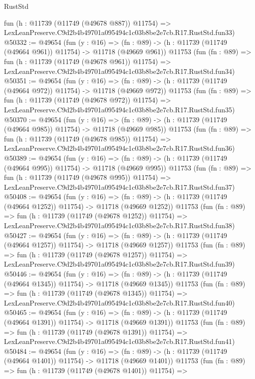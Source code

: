 \begin{lexlean}{RustStd}
\begin{coremodule}
    fun (h : @11739 (@11749 (@49678 @887)) @11754) =>
    LexLeanPreserve.C9d2b4b49701a095494c1c03b8be2e7cb.R17.RustStd.fun33)
@50332 := @49654
    (fun (y : @16) =>
    (fn : @89) -> (h : @11739 (@11749 (@49664 @961)) @11754) -> @11718 (@49669 @961))
    @11753
    (fun (fn : @89) =>
    fun (h : @11739 (@11749 (@49678 @961)) @11754) =>
    LexLeanPreserve.C9d2b4b49701a095494c1c03b8be2e7cb.R17.RustStd.fun34)
@50351 := @49654
    (fun (y : @16) =>
    (fn : @89) -> (h : @11739 (@11749 (@49664 @972)) @11754) -> @11718 (@49669 @972))
    @11753
    (fun (fn : @89) =>
    fun (h : @11739 (@11749 (@49678 @972)) @11754) =>
    LexLeanPreserve.C9d2b4b49701a095494c1c03b8be2e7cb.R17.RustStd.fun35)
@50370 := @49654
    (fun (y : @16) =>
    (fn : @89) -> (h : @11739 (@11749 (@49664 @985)) @11754) -> @11718 (@49669 @985))
    @11753
    (fun (fn : @89) =>
    fun (h : @11739 (@11749 (@49678 @985)) @11754) =>
    LexLeanPreserve.C9d2b4b49701a095494c1c03b8be2e7cb.R17.RustStd.fun36)
@50389 := @49654
    (fun (y : @16) =>
    (fn : @89) -> (h : @11739 (@11749 (@49664 @995)) @11754) -> @11718 (@49669 @995))
    @11753
    (fun (fn : @89) =>
    fun (h : @11739 (@11749 (@49678 @995)) @11754) =>
    LexLeanPreserve.C9d2b4b49701a095494c1c03b8be2e7cb.R17.RustStd.fun37)
@50408 := @49654
    (fun (y : @16) =>
    (fn : @89) -> (h : @11739 (@11749 (@49664 @1252)) @11754) -> @11718 (@49669 @1252))
    @11753
    (fun (fn : @89) =>
    fun (h : @11739 (@11749 (@49678 @1252)) @11754) =>
    LexLeanPreserve.C9d2b4b49701a095494c1c03b8be2e7cb.R17.RustStd.fun38)
@50427 := @49654
    (fun (y : @16) =>
    (fn : @89) -> (h : @11739 (@11749 (@49664 @1257)) @11754) -> @11718 (@49669 @1257))
    @11753
    (fun (fn : @89) =>
    fun (h : @11739 (@11749 (@49678 @1257)) @11754) =>
    LexLeanPreserve.C9d2b4b49701a095494c1c03b8be2e7cb.R17.RustStd.fun39)
@50446 := @49654
    (fun (y : @16) =>
    (fn : @89) -> (h : @11739 (@11749 (@49664 @1345)) @11754) -> @11718 (@49669 @1345))
    @11753
    (fun (fn : @89) =>
    fun (h : @11739 (@11749 (@49678 @1345)) @11754) =>
    LexLeanPreserve.C9d2b4b49701a095494c1c03b8be2e7cb.R17.RustStd.fun40)
@50465 := @49654
    (fun (y : @16) =>
    (fn : @89) -> (h : @11739 (@11749 (@49664 @1391)) @11754) -> @11718 (@49669 @1391))
    @11753
    (fun (fn : @89) =>
    fun (h : @11739 (@11749 (@49678 @1391)) @11754) =>
    LexLeanPreserve.C9d2b4b49701a095494c1c03b8be2e7cb.R17.RustStd.fun41)
@50484 := @49654
    (fun (y : @16) =>
    (fn : @89) -> (h : @11739 (@11749 (@49664 @1401)) @11754) -> @11718 (@49669 @1401))
    @11753
    (fun (fn : @89) =>
    fun (h : @11739 (@11749 (@49678 @1401)) @11754) =>

\end{coremodule}
\end{lexlean}
